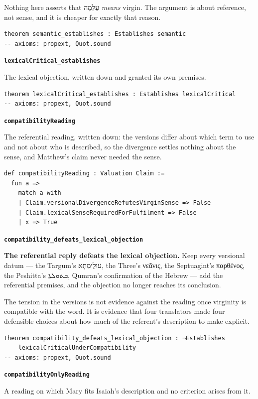 \documentclass[11pt]{article}
\begin{document}
Nothing here asserts that עַלְמָה \emph{means} virgin. The argument is about reference, not sense, and it is cheaper for exactly that reason.

{\small\begin{verbatim}
theorem semantic_establishes : Establishes semantic
-- axioms: propext, Quot.sound
\end{verbatim}}
\par\medskip\noindent\textbf{\texttt{lexical\allowbreak{}Critical\_\allowbreak{}establishes}}\par\nobreak\noindent
The lexical objection, written down and granted its own premises.

{\small\begin{verbatim}
theorem lexicalCritical_establishes : Establishes lexicalCritical
-- axioms: propext, Quot.sound
\end{verbatim}}
\par\medskip\noindent\textbf{\texttt{compatibility\allowbreak{}Reading}}\par\nobreak\noindent
The referential reading, written down: the versions differ about which term to use and not about who is described, so the divergence settles nothing about the sense, and Matthew’s claim never needed the sense.

{\small\begin{verbatim}
def compatibilityReading : Valuation Claim :=
  fun a =>
    match a with
    | Claim.versionalDivergenceRefutesVirginSense => False
    | Claim.lexicalSenseRequiredForFulfilment => False
    | x => True
\end{verbatim}}
\par\medskip\noindent\textbf{\texttt{compatibility\_\allowbreak{}defeats\_\allowbreak{}lexical\_\allowbreak{}objection}}\par\nobreak\noindent
\textbf{The referential reply defeats the lexical objection.} Keep every versional datum — the Targum’s עוּלֵימְתָא, the Three’s νεᾶνις, the Septuagint’s παρθένος, the Peshitta’s ܒܬܘܠܬܐ, Qumran’s confirmation of the Hebrew — add the referential premises, and the objection no longer reaches its conclusion.

The tension in the versions is not evidence against the reading once virginity is compatible with the word. It is evidence that four translators made four defensible choices about how much of the referent’s description to make explicit.

{\small\begin{verbatim}
theorem compatibility_defeats_lexical_objection : ¬Establishes
    lexicalCriticalUnderCompatibility
-- axioms: propext, Quot.sound
\end{verbatim}}
\par\medskip\noindent\textbf{\texttt{compatibility\allowbreak{}Only\allowbreak{}Reading}}\par\nobreak\noindent
A reading on which Mary fits Isaiah’s description and no criterion arises from it.
\end{document}
